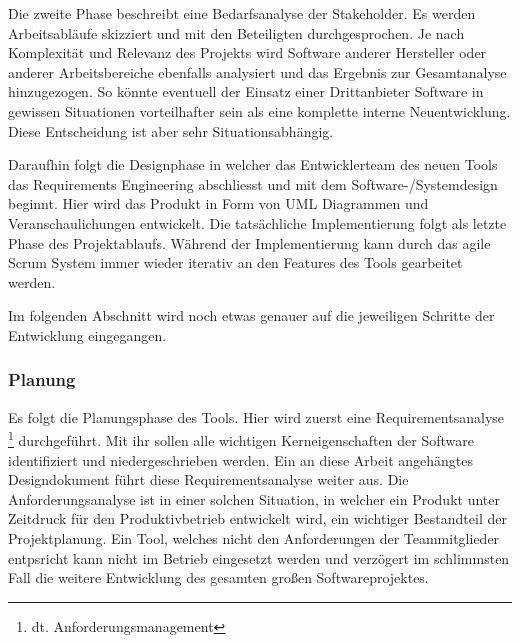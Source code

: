 \documentclass[pagesize, paper=a4, fontsize=12pt,titlepage=true, headings=small, headnosepline, abstractoff, liststotoc, nochapterprefix, plainheadsepline, twoside]{scrreprt}
\begin{document}
Die zweite Phase beschreibt eine Bedarfsanalyse der Stakeholder. Es werden Arbeitsabläufe skizziert und mit den Beteiligten durchgesprochen. Je nach Komplexität und Relevanz des Projekts wird Software anderer Hersteller oder anderer Arbeitsbereiche ebenfalls analysiert und das Ergebnis zur Gesamtanalyse hinzugezogen. So könnte eventuell der Einsatz einer Drittanbieter Software in gewissen Situationen vorteilhafter sein als eine komplette interne Neuentwicklung. Diese Entscheidung ist aber sehr Situationsabhängig.

Daraufhin folgt die Designphase in welcher das Entwicklerteam des neuen Tools das Requirements Engineering abschliesst und mit dem Software-/Systemdesign beginnt. Hier wird das Produkt in Form von UML Diagrammen und Veranschaulichungen entwickelt. Die tatsächliche Implementierung folgt als letzte Phase des Projektablaufs. Während der Implementierung kann durch das agile Scrum System immer wieder iterativ an den Features des Tools gearbeitet werden.

Im folgenden Abschnitt wird noch etwas genauer auf die jeweiligen Schritte der Entwicklung eingegangen.

\subsubsection{Planung}
Es folgt die Planungsphase des Tools. Hier wird zuerst eine Requirementsanalyse \footnote{dt. Anforderungsmanagement} durchgeführt. Mit ihr sollen alle wichtigen Kerneigenschaften der Software identifiziert und niedergeschrieben werden. Ein an diese Arbeit angehängtes Designdokument führt diese Requirementsanalyse weiter aus. Die Anforderungsanalyse ist in einer solchen Situation, in welcher ein Produkt unter Zeitdruck für den Produktivbetrieb entwickelt wird, ein wichtiger Bestandteil der Projektplanung. Ein Tool, welches nicht den Anforderungen der Teammitglieder entpsricht kann nicht im Betrieb eingesetzt werden und verzögert im schlimmsten Fall die weitere Entwicklung des gesamten großen Softwareprojektes.
\end{document}

